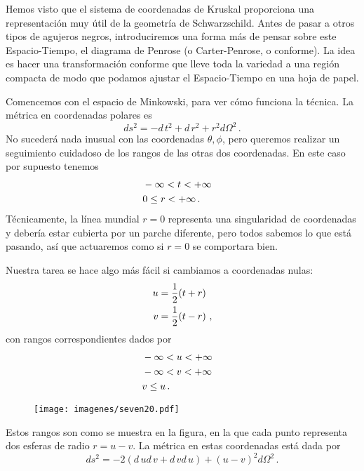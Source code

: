 \documentclass[11pt,b5paper,openany,twoside]{book}
\begin{document}
Hemos visto que el sistema de coordenadas de Kruskal proporciona una representación muy útil de la geometría de Schwarzschild.
Antes de pasar a otros tipos de agujeros negros, introduciremos una forma más de pensar sobre este Espacio-Tiempo, el diagrama de Penrose (o Carter-Penrose, o conforme).
La idea es hacer una transformación conforme que lleve toda la variedad a una región compacta de modo que podamos ajustar el Espacio-Tiempo en una hoja de papel.

Comencemos con el espacio de Minkowski, para ver cómo funciona la técnica.
La métrica en coordenadas polares es
\begin{equation}
ds^2 = - d\,t^2 +  d\,r^2 + r^2 d\Omega^2\,.\label{7.86}
\end{equation}
No sucederá nada inusual con las coordenadas $\theta, \phi$, pero queremos realizar un seguimiento cuidadoso de los rangos de las otras dos coordenadas.
En este caso por supuesto tenemos
\begin{align}
& -\infty < t < +\infty& \notag \\
& 0 \leq r < +\infty\,.&
\label{7.87}
\end{align}
Técnicamente, la línea mundial $r=0$ representa una singularidad de coordenadas y debería estar cubierta por un parche diferente, pero todos sabemos lo que está pasando, así que actuaremos como si $r=0$ se comportara bien.

Nuestra tarea se hace algo más fácil si cambiamos a coordenadas nulas:
\begin{align}
u  &=  {1\over 2}(t+r) \notag \\  v  &=  {1\over 2}(t-r)\ ,
\label{7.88}
\end{align}
con rangos correspondientes dados por
\begin{align}
&-\infty < u < +\infty & \notag \\  &-\infty < v < +\infty & \notag \\
& v \leq u\,.&\label{7.89}
\end{align}
\begin{figure}[h]
\centering
\texttt{[image: imagenes/seven20.pdf]}
\end{figure}
Estos rangos son como se muestra en la figura, en la que cada punto representa dos esferas de radio $r=u-v$.
La métrica en estas coordenadas está dada por
\begin{equation}
ds^2 = -2( d\,u d\,v +  d\,v d\,u) +(u-v)^2 d\Omega^2\,.\label{7.90}
\end{equation}
\end{document}

